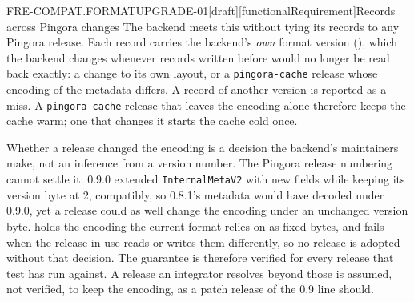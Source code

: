 \begin{requirement}{FRE-COMPAT.FORMATUPGRADE-01}[draft][functionalRequirement]{Records across Pingora changes}
  The backend meets this without tying its records to any Pingora release.
  Each record carries the backend's \emph{own} format version
  (), which the backend changes whenever
  records written before would no longer be read back exactly: a change to
  its own layout, or a \texttt{pingora-cache} release whose encoding of the
  metadata differs. A record of another version is reported as a miss. A
  \texttt{pingora-cache} release that leaves the encoding alone therefore
  keeps the cache warm; one that changes it starts the cache cold once.

  Whether a release changed the encoding is a decision the backend's
  maintainers make, not an inference from a version number. The Pingora
  release numbering cannot settle it: 0.9.0 extended \texttt{InternalMetaV2} with new
  fields while keeping its version byte at 2, compatibly, so 0.8.1's metadata
  would have decoded under 0.9.0, yet a release could as well change the
  encoding under an unchanged version byte.
   holds the encoding the current format
  relies on as fixed bytes, and fails when the release in use reads or
  writes them differently, so no release is adopted without that decision.
  The guarantee is therefore verified for every release that test has run
  against. A release an integrator resolves beyond those is assumed, not
  verified, to keep the encoding, as a patch release of the 0.9 line
  should.



\end{requirement}

